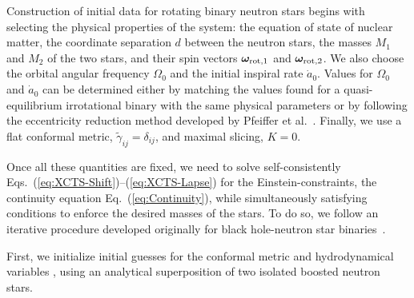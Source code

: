 \documentclass[aps,prd,amsmath,floatfix
,twocolumn
,superscriptaddress,nofootinbib,showpacs]{revtex4-1}
\theoremstyle{plain} \newtheorem{thm}{Theorem} \newtheorem{lem}{Lemma}
\newcommand{\red}[1]{\textcolor{Red}{#1}}
\newcommand{\harald}[1]{{\textcolor{OliveGreen}{#1}}} %
\begin{document}
Construction of initial data for rotating binary neutron stars
begins with selecting the physical properties of the system: the equation of
state of nuclear matter, the coordinate separation $d$ between the
neutron stars, the masses $M_1$ and $M_2$ of the two stars, and their
spin vectors ${\bm \omega}_{\rm rot,1}$ and ${\bm \omega}_{\rm
  rot,2}$. We also choose the orbital angular frequency $\Omega_0$
and the initial inspiral rate $\dot{a}_0$.  
Values for $\Omega_0$ and $\dot{a}_0$ can be determined either by matching the values found for a quasi-equilibrium irrotational binary with the same
physical parameters or by following the eccentricity reduction method
developed by Pfeiffer et al.~\cite{Pfeiffer-Brown-etal:2007}. Finally, we use a flat conformal metric, $\tilde\gamma_{ij}=\delta_{ij}$,
and maximal slicing, $K=0$.

Once all these quantities are fixed, we need to solve self-consistently Eqs.~(\ref{eq:XCTS-Shift})--(\ref{eq:XCTS-Lapse}) for the Einstein-constraints, the continuity equation Eq.~(\ref{eq:Continuity}), while simultaneously satisfying conditions to enforce the desired masses of the stars. 
To do so, we follow an iterative procedure developed originally for black hole-neutron star
binaries~\cite{FoucartEtAl:2011}.

First, we initialize initial guesses
for the conformal metric and hydrodynamical variables 
, using an
analytical superposition of two isolated boosted neutron stars.
\end{document}
